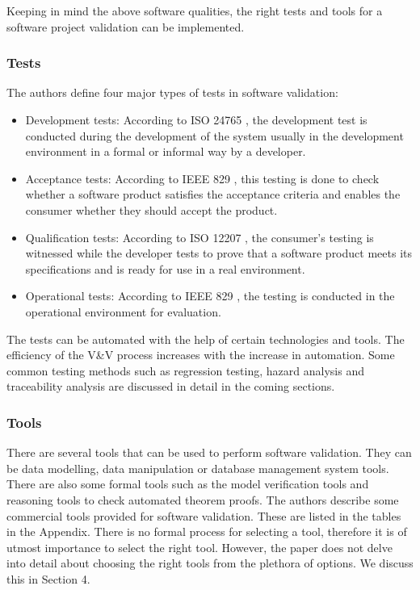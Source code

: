 \documentclass[journal, onecolumn]{IEEEtran}
\begin{document}
	Keeping in mind the above software qualities, the right tests and tools for a software project validation can be implemented.
	
	\bigskip
	
	\subsubsection{Tests}
	
	The authors define four major types of tests in software validation:
	
	\begin{itemize}
		\item Development tests: According to ISO 24765 \cite{ISO24765}, the development test is conducted during the development of the system usually in the development environment in a formal or informal way by a developer.
		\item Acceptance tests: According to IEEE 829 \cite{ieee829}, this testing is done to check whether a software product satisfies the acceptance criteria and enables the consumer whether they should accept the product.
		\item Qualification tests: According to ISO 12207 \cite{iso12207}, the consumer's testing is witnessed while the developer tests to prove that a software product meets its specifications and is ready for use in a real environment.
		\item Operational tests: According to IEEE 829 \cite{ieee829}, the testing is conducted in the operational environment for evaluation.
	\end{itemize}
	\bigskip
	The tests can be automated with the help of certain technologies and tools. The efficiency of the V\&V process increases with the increase in automation. Some common testing methods such as regression testing, hazard analysis and traceability analysis are discussed in detail in the coming sections.
	
	\bigskip
	
	\subsubsection{Tools}
	
	There are several tools that can be used to perform software validation. They can be data modelling, data manipulation or database management system tools. There are also some formal tools such as the model verification tools and reasoning tools to check automated theorem proofs.  
	\newline \newline
	The authors describe some commercial tools provided for software validation. These are listed in the tables in the Appendix.
	\newline \newline
	There is no formal process for selecting a tool, therefore it is of utmost importance to select the right tool. However, the paper does not delve into detail about choosing the right tools from the plethora of options. We discuss this in Section 4. 
	
\end{document}
